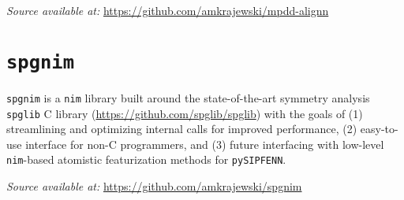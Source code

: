 \hspace{24pt} 
\textit{Source available at:} 
\href{https://github.com/amkrajewski/mpdd-alignn}{https://github.com/amkrajewski/mpdd-alignn}


\section{\texttt{spgnim}} \label{osoft:sec:spgnim}

\texttt{spgnim} is a \texttt{nim} library built around the state-of-the-art symmetry analysis \texttt{spglib} C library (\href{https://github.com/spglib/spglib}{https://github.com/spglib/spglib}) with the goals of (1) streamlining and optimizing internal calls for improved performance, (2) easy-to-use interface for non-C programmers, and (3) future interfacing with low-level \texttt{nim}-based atomistic featurization methods for \texttt{pySIPFENN}.

\hspace{24pt} 
\textit{Source available at:} 
\href{https://github.com/amkrajewski/spgnim}{https://github.com/amkrajewski/spgnim}



 
